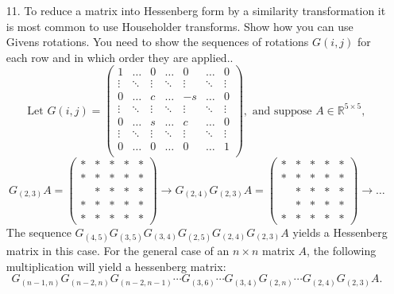 \documentclass[11pt]{article}
\newcommand{\R}{\mathbb{R}}
\begin{document}
\begin{enumerate}
	\item[11.] To reduce a matrix into Hessenberg form by a similarity transformation it is most common to use Householder transforms.  Show how you can use Givens rotations.  You need to show the sequences of rotations \(G(i,j)\) for each row and in which order they are applied.. \\
    \[\text{Let } G(i,j) =
    \left(\begin{array}{rrrrrrr}
      1 & \hdots & 0 & \hdots & 0 & \hdots & 0 \\
      \vdots & \ddots & \vdots & \ddots & \vdots  & \ddots & \vdots \\
      0 & \hdots & c & \hdots & -s & \hdots & 0 \\
      \vdots & \ddots & \vdots & \ddots & \vdots  & \ddots & \vdots \\
      0 & \hdots & s & \hdots & c & \hdots & 0 \\
      \vdots & \ddots & \vdots & \ddots & \vdots  & \ddots & \vdots \\
      0 & \hdots & 0 & \hdots & 0 & \hdots & 1 \\
    \end{array}\right), \text{ and suppose } A \in \R^{5 \times 5},
    \]
    \[G_{(2,3)} A = \begin{pmatrix} * & * & * & * & * \\ * & * & * & * & * \\  & * & * & * & * \\ * & * & * & * & * \\ * & * & * & * & * \end{pmatrix} \to G_{(2,4)} G_{(2,3)} A = \begin{pmatrix} * & * & * & * & * \\ * & * & * & * & * \\  & * & * & * & * \\  & * & * & * & * \\ * & * & * & * & * \end{pmatrix} \to \dots\]
    The sequence \(G_{(4,5)}G_{(3,5)}G_{(3,4)}G_{(2,5)}G_{(2,4)}G_{(2,3)}A\) yields a Hessenberg matrix in this case.  For the general case of an \(n \times n\) matrix \(A\), the following multiplication will yield a hessenberg matrix:
    \[G_{(n-1, n)} G_{(n-2, n)} G_{(n-2, n-1)} \cdots G_{(3,6)} \cdots G_{(3,4)} G_{(2,n)} \cdots G_{(2,4)} G_{(2,3)} A.\]


\end{enumerate}
\end{document}
